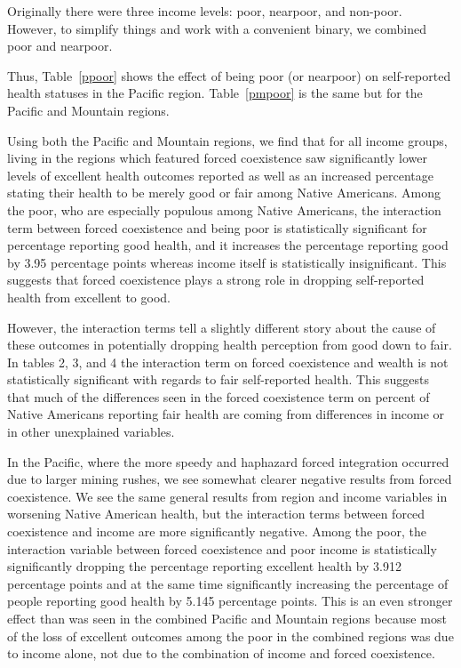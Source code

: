 \documentclass[12pt]{article}
\begin{document}
Originally there were three income levels: poor, nearpoor, and non-poor. However, to simplify things and work with a convenient binary, we combined poor and nearpoor.

Thus, Table~\ref{ppoor} shows the effect of being poor (or nearpoor) on self-reported health statuses in the Pacific region. Table~\ref{pmpoor} is the same but for the Pacific and Mountain regions.

Using both the Pacific and Mountain regions, we find that for all income groups, living in the regions which featured forced coexistence saw significantly lower levels of excellent health outcomes reported as well as an increased percentage stating their health to be merely good or fair among Native Americans.  Among the poor, who are especially populous among Native Americans, the interaction term between forced coexistence and being poor is statistically significant for percentage reporting good health, and it increases the percentage reporting good by 3.95 percentage points whereas income itself is statistically insignificant.  This suggests that forced coexistence plays a strong role in dropping self-reported health from excellent to good.

However, the interaction terms tell a slightly different story about the cause of these outcomes in potentially dropping health perception from good down to fair.  In tables 2, 3, and 4 the interaction term on forced coexistence and wealth is not statistically significant with regards to fair self-reported health.  This suggests that much of the differences seen in the forced coexistence term on percent of Native Americans reporting fair health are coming from differences in income or in other unexplained variables.  

In the Pacific, where the more speedy and haphazard forced integration occurred due to larger mining rushes, we see somewhat clearer negative results from forced coexistence.  We see the same general results from region and income variables in worsening Native American health, but the interaction terms between forced coexistence and income are more significantly negative.  Among the poor, the interaction variable between forced coexistence and poor income is statistically significantly dropping the percentage reporting excellent health by 3.912 percentage points and at the same time significantly increasing the percentage of people reporting good health by 5.145 percentage points.  This is an even stronger effect than was seen in the combined Pacific and Mountain regions because most of the loss of excellent outcomes among the poor in the combined regions was due to income alone, not due to the combination of income and forced coexistence.
\end{document}
